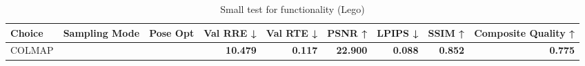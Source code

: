 \begin{table}[H]
\caption{\ifdefined\customcaption \customcaption \else Small test for functionality (Lego) \fi}
\label{tab:99_test_lego}
\centering
\scriptsize
\begin{tabular}{lrlrrrrrr}
\toprule
Choice & Sampling Mode & Pose Opt & Val RRE ↓ & Val RTE ↓ & PSNR ↑ & LPIPS ↓ & SSIM ↑ & Composite Quality ↑ \\
\midrule
COLMAP &  &  & \textbf{10.479} & \textbf{0.117} & \textbf{22.900} & \textbf{0.088} & \textbf{0.852} & \textbf{0.775} \\
\bottomrule
\end{tabular}
\end{table}